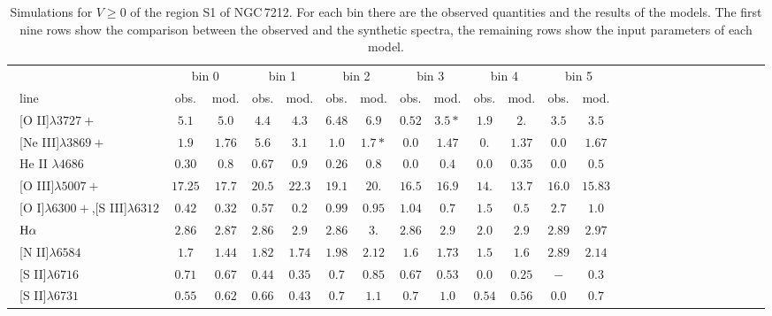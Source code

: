 \documentclass[../thesis.tex]{subfiles}
\begin{document}
\begin{landscape}
\begin{table}

\centering
\caption{Simulations for $V\ge0$ of the region S1 of NGC\,7212. For each bin there are the observed quantities and the results of the models. The first nine rows show the comparison between the observed and the synthetic spectra, the remaining rows show the input parameters of each model.}
\label{tab:sim_s1+N}


\small{
\begin{tabular}{lcccccccccccccccccccccccc}
\hline
\ &\multicolumn{2}{c}{bin 0} &\multicolumn{2}{c}{bin 1}&\multicolumn{2}{c}{bin 2}&\multicolumn{2}{c}{bin 3}&\multicolumn{2}{c}{bin 4}&\multicolumn{2}{c}{bin 5}\\
\   line              &obs.  &mod. & obs.  &mod. &obs.&mod.  &obs.  &mod.&obs.  &mod. &obs.  &mod. \\ \hline
\ [O II]$\lambda3727+$          &$5.1   $&$5.0   $&$4.4    $&$ 4.3  $&$6.48 $&$6.9   $&$0.52  $&$3.5* $&$1.9   $&$2.    $&$3.5   $&$3.5  $ \\
\  [Ne III]$\lambda3869+$        &$1.9   $&$1.76  $&$5.6    $&$ 3.1  $&$1.0  $&$1.7*  $&$0.0   $&$1.47  $&$0.    $&$1.37  $&$0.0   $&$1.67 $ \\
\  He II $\lambda4686$           &$0.30  $&$0.8   $&$0.67   $&$ 0.9  $&$0.26 $&$0.8   $&$0.0   $&$0.4   $&$0.0   $&$0.35  $&$0.0   $&$0.5$  \\
\  [O III]$\lambda5007+$         &$17.25 $&$17.7  $&$ 20.5  $&$ 22.3 $&$19.1 $&$20.   $&$16.5  $&$16.9  $&$14.   $&$13.7  $&$16.0  $&$15.83$\\
\  [O I]$\lambda6300+$,[S III]$\lambda6312$&$0.42  $&$0.32  $&$0.57   $&$0.2   $&$0.99 $&$0.95  $&$1.04  $&$0.7   $&$1.5   $&$0.5   $&$2.7   $&$1.0 $ \\
\ $\rm H\alpha$                 &$2.86  $&$2.87  $&$2.86   $&$ 2.9  $&$2.86 $&$3.    $&$2.86  $&$2.9   $&$2.0   $&$2.9   $&$2.89  $&$2.97 $\\
\  [N II]$\lambda6584$           &$1.7   $&$1.44  $&$1.82   $&$ 1.74 $&$1.98 $&$2.12  $&$1.6   $&$1.73  $&$1.5   $&$1.6   $&$2.89  $&$2.14 $\\
\  [S II]$\lambda6716$           &$0.71  $&$0.67  $&$0.44   $&$ 0.35 $&$0.7  $&$0.85  $&$0.67  $&$0.53  $&$0.0   $&$0.25  $&$   -  $&$0.3 $ \\
\  [S II]$\lambda6731$           &$0.55  $&$0.62  $&$0.66   $&$ 0.43 $&$0.7  $&$1.1   $&$0.7   $&$1.0   $&$0.54  $&$0.56  $&$0.0   $&$0.7 $ \\

\end{tabular}}
\end{table}
\end{landscape}
\end{document}
